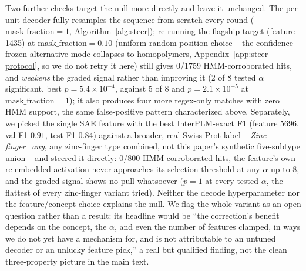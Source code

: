\documentclass{article}
\begin{document}
Two further checks target the null more directly and leave it unchanged. The per-unit
decoder fully resamples the sequence from scratch every round ($\mathrm{mask\_fraction}{=}1$,
Algorithm~\ref{alg:steer}); re-running the flagship target (feature 1435) at
$\mathrm{mask\_fraction}{=}0.10$ (uniform-random position choice -- the confidence-frozen
alternative mode-collapses to homopolymers, Appendix~\ref{app:steer-protocol}, so we do not
retry it here) still gives 0/1759 HMM-corroborated hits, and \emph{weakens} the graded signal
rather than improving it (2 of 8 tested $\alpha$ significant, best $p{=}5.4\times10^{-4}$,
against 5 of 8 and $p{=}2.1\times10^{-5}$ at $\mathrm{mask\_fraction}{=}1$); it also produces
four more regex-only matches with zero HMM support, the same false-positive pattern
characterized above. Separately, we picked the single SAE feature with the best
InterPLM-exact F1 (feature 5696, val F1 $0.91$, test F1 $0.84$) against a broader, real
Swiss-Prot label -- \emph{Zinc finger\_any}, any zinc-finger type combined, not this paper's
synthetic five-subtype union -- and steered it directly: 0/800 HMM-corroborated hits, the
feature's own re-embedded activation never approaches its selection threshold at any $\alpha$
up to 8, and the graded signal shows no pull whatsoever ($p{=}1$ at every tested $\alpha$, the
flattest of every zinc-finger variant tried). Neither the decode hyperparameter nor the
feature/concept choice explains the null. We flag the whole variant as an open question
rather than a result: its headline would be ``the correction's benefit depends on the
concept, the $\alpha$, and even the number of features clamped, in ways we do not yet have a
mechanism for, and is not attributable to an untuned decoder or an unlucky feature pick,''
a real but qualified finding, not the clean three-property picture in the main text.
\end{document}
